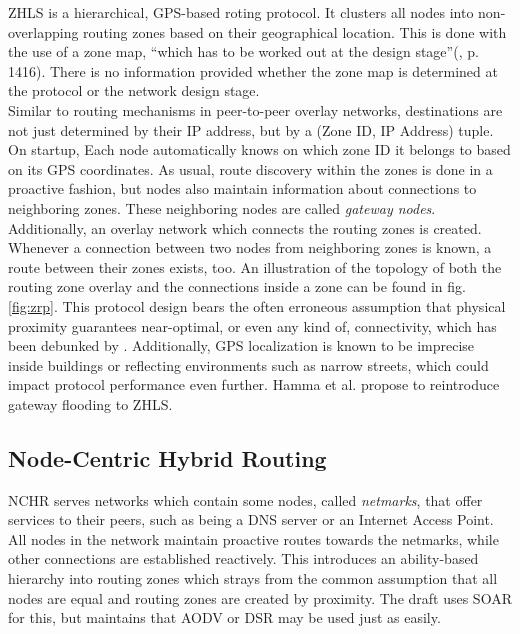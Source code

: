 \documentclass[a4paper,10pt]{scrartcl}
\begin{document}
ZHLS is a hierarchical, GPS-based roting protocol. It clusters all nodes into non-overlapping routing zones based on their geographical location. This is done with the use of a zone map, ``which has to be worked out at the design stage''(\cite{ZHLS}, p. 1416). There is no information provided whether the zone map is determined at the protocol or the network design stage.\\
Similar to routing mechanisms in peer-to-peer overlay networks, destinations are not just determined by their IP address, but by a (Zone ID, IP Address) tuple. On startup, Each node automatically knows on which zone ID it belongs to based on its GPS coordinates.
As usual, route discovery within the zones is done in a proactive fashion, but nodes also maintain information about connections to neighboring zones. These neighboring nodes are called \emph{gateway nodes}. Additionally, an overlay network which connects the routing zones is created. Whenever a connection between two nodes from neighboring zones is known, a route between their zones exists, too. An illustration of the topology of both the routing zone overlay and the connections inside a zone can be found in fig. \ref{fig:zrp}.
This protocol design bears the often erroneous assumption that physical proximity guarantees near-optimal, or even any kind of, connectivity, which has been debunked by \cite{mistaken-axioms}. Additionally, GPS localization is known to be imprecise inside buildings or reflecting environments such as narrow streets, which could impact protocol performance even further. 
Hamma et al.\cite{ZHLS-GF} propose to reintroduce gateway flooding to ZHLS.

\subsection{Node-Centric Hybrid Routing}
\label{subsec:nchr}
NCHR\cite{Roy_nodecentric} serves networks which contain some nodes, called \emph{netmarks}, that offer services to their peers, such as being a DNS server or an Internet Access Point. All nodes in the network maintain proactive routes towards the netmarks, while other connections are established reactively. This introduces an ability-based hierarchy into routing zones which strays from the common assumption that all nodes are equal and routing zones are created by proximity. 
The draft uses SOAR\cite{SOAR} for this, but maintains that AODV\cite{RFC-3561} or DSR\cite{DSR} may be used just as easily.
\end{document}
